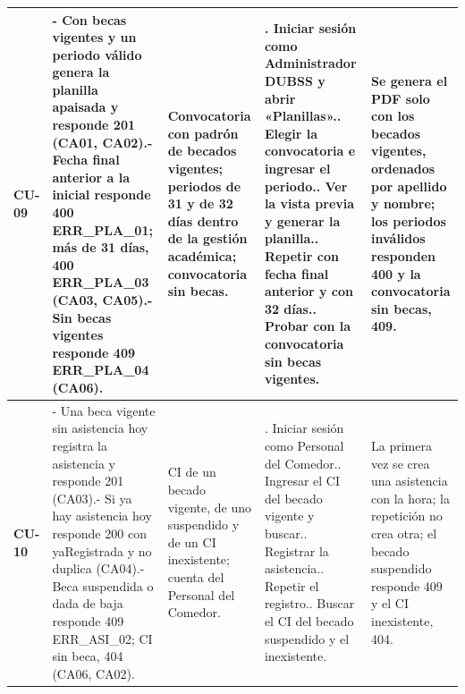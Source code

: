 {\begin{longtable}{@{}>{\raggedright\arraybackslash}p{1.2cm}>{\raggedright\arraybackslash}p{3.7cm}>{\raggedright\arraybackslash}p{3.0cm}>{\raggedright\arraybackslash}p{4.4cm}>{\raggedright\arraybackslash}p{3.4cm}@{}}
\textbf{CU-09} & - Con becas vigentes y un periodo válido genera la planilla apaisada y responde 201 (CA01, CA02).\newline - Fecha final anterior a la inicial responde 400 ERR\_PLA\_01; más de 31 días, 400 ERR\_PLA\_03 (CA03, CA05).\newline - Sin becas vigentes responde 409 ERR\_PLA\_04 (CA06). & Convocatoria con padrón de becados vigentes; periodos de 31 y de 32 días dentro de la gestión académica; convocatoria sin becas. & 1. Iniciar sesión como Administrador DUBSS y abrir «Planillas».\newline 2. Elegir la convocatoria e ingresar el periodo.\newline 3. Ver la vista previa y generar la planilla.\newline 4. Repetir con fecha final anterior y con 32 días.\newline 5. Probar con la convocatoria sin becas vigentes. & Se genera el PDF solo con los becados vigentes, ordenados por apellido y nombre; los periodos inválidos responden 400 y la convocatoria sin becas, 409. \\
\midrule
\textbf{CU-10} & - Una beca vigente sin asistencia hoy registra la asistencia y responde 201 (CA03).\newline - Si ya hay asistencia hoy responde 200 con yaRegistrada y no duplica (CA04).\newline - Beca suspendida o dada de baja responde 409 ERR\_ASI\_02; CI sin beca, 404 (CA06, CA02). & CI de un becado vigente, de uno suspendido y de un CI inexistente; cuenta del Personal del Comedor. & 1. Iniciar sesión como Personal del Comedor.\newline 2. Ingresar el CI del becado vigente y buscar.\newline 3. Registrar la asistencia.\newline 4. Repetir el registro.\newline 5. Buscar el CI del becado suspendido y el inexistente. & La primera vez se crea una asistencia con la hora; la repetición no crea otra; el becado suspendido responde 409 y el CI inexistente, 404. \\
\midrule

\end{longtable}}
